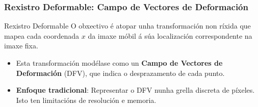 \documentclass[xcolor=dvipsnames]{beamer}
\begin{document}
\begin{frame}
    \frametitle{Rexistro Deformable: Campo de Vectores de Deformación}
    
    \begin{block}{Rexistro Deformable}
        O obxectivo é atopar unha transformación non ríxida que mapea cada coordenada $x$ da imaxe móbil á súa localización correspondente na imaxe fixa.
        \begin{itemize}
            \item Esta transformación modélase como un \textbf{Campo de Vectores de Deformación} (DFV), que indica o desprazamento de cada punto.
            \item \textbf{Enfoque tradicional}: Representar o DFV nunha grella discreta de píxeles. Isto ten limitacións de resolución e memoria.
        \end{itemize}
    \end{block}



\end{frame}
\end{document}

